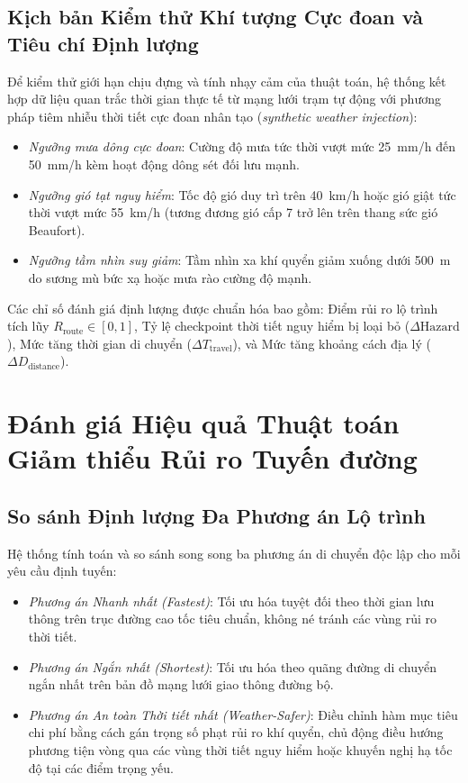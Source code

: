 \subsection{Kịch bản Kiểm thử Khí tượng Cực đoan và Tiêu chí Định lượng}
Để kiểm thử giới hạn chịu đựng và tính nhạy cảm của thuật toán, hệ thống kết hợp dữ liệu quan trắc thời gian thực tế từ mạng lưới trạm tự động với phương pháp tiêm nhiễu thời tiết cực đoan nhân tạo (\textit{synthetic weather injection}):
\begin{itemize}
    \item[-] \textit{Ngưỡng mưa dông cực đoan}: Cường độ mưa tức thời vượt mức 25~mm/h đến 50~mm/h kèm hoạt động dông sét đối lưu mạnh.
    \item[-] \textit{Ngưỡng gió tạt nguy hiểm}: Tốc độ gió duy trì trên 40~km/h hoặc gió giật tức thời vượt mức 55~km/h (tương đương gió cấp 7 trở lên trên thang sức gió Beaufort).
    \item[-] \textit{Ngưỡng tầm nhìn suy giảm}: Tầm nhìn xa khí quyển giảm xuống dưới 500~m do sương mù bức xạ hoặc mưa rào cường độ mạnh.
\end{itemize}

Các chỉ số đánh giá định lượng được chuẩn hóa bao gồm: Điểm rủi ro lộ trình tích lũy $R_{\text{route}} \in [0, 1]$, Tỷ lệ checkpoint thời tiết nguy hiểm bị loại bỏ ($\Delta\text{Hazard}$), Mức tăng thời gian di chuyển ($\Delta T_{\text{travel}}$), và Mức tăng khoảng cách địa lý ($\Delta D_{\text{distance}}$).

\section{Đánh giá Hiệu quả Thuật toán Giảm thiểu Rủi ro Tuyến đường}
\label{sec:route_risk_mitigation}

\subsection{So sánh Định lượng Đa Phương án Lộ trình}
Hệ thống tính toán và so sánh song song ba phương án di chuyển độc lập cho mỗi yêu cầu định tuyến:
\begin{itemize}
    \item[-] \textit{Phương án Nhanh nhất (Fastest)}: Tối ưu hóa tuyệt đối theo thời gian lưu thông trên trục đường cao tốc tiêu chuẩn, không né tránh các vùng rủi ro thời tiết.
    \item[-] \textit{Phương án Ngắn nhất (Shortest)}: Tối ưu hóa theo quãng đường di chuyển ngắn nhất trên bản đồ mạng lưới giao thông đường bộ.
    \item[-] \textit{Phương án An toàn Thời tiết nhất (Weather-Safer)}: Điều chỉnh hàm mục tiêu chi phí bằng cách gán trọng số phạt rủi ro khí quyển, chủ động điều hướng phương tiện vòng qua các vùng thời tiết nguy hiểm hoặc khuyến nghị hạ tốc độ tại các điểm trọng yếu.
\end{itemize}

